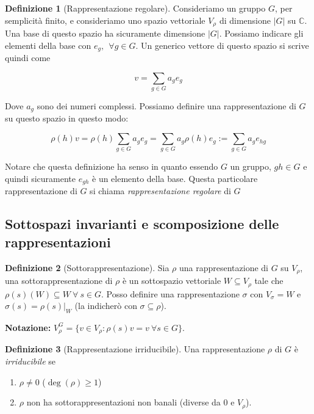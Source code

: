 \documentclass[11pt]{article}
\theoremstyle{plain}
\theoremstyle{definition}
\newtheorem{defn}{Definizione}[section]
\theoremstyle{remark}
\newcommand{\C}{\mathbb{C}}
\newcommand{\dsum}{\displaystyle\sum}
\begin{document}
\begin{defn}[Rappresentazione regolare]
  Consideriamo un gruppo $G$, per semplicità finito, e consideriamo uno spazio vettoriale $V_\rho$ di dimensione $|G|$ su $\C$. Una base di questo spazio ha sicuramente dimensione $|G|$. Possiamo indicare gli elementi della base con $e_g, \ \ \forall g \in G$. Un generico vettore di questo spazio si scrive quindi come

  \[ v = \dsum_{g \in G} a_g e_g \]

  Dove $a_g$ sono dei numeri complessi. Possiamo definire una rappresentazione di $G$ su questo spazio in questo modo:

  \[ \rho(h)v = \rho(h) \dsum_{g \in G} a_g e_g = \dsum_{g\in G} a_g \rho(h) e_g := \dsum_{g \in G} a_g e_{hg} \]

  Notare che questa definizione ha senso in quanto essendo $G$ un gruppo, $gh \in G$ e quindi sicuramente $e_{gh}$ è un elemento della base. Questa particolare rappresentazione di $G$ si chiama \emph{rappresentazione regolare} di $G$



  \label{defn:rappresentazione regolare}
\end{defn}



\subsection{Sottospazi invarianti e scomposizione delle rappresentazioni}



\begin{defn}[Sottorappresentazione]
Sia $\rho$ una rappresentazione di $G$ su $V_{\rho}$, una sottorappresentazione di $\rho$ è un sottospazio vettoriale $W\subseteq V_{\rho}$ tale che $\rho(s)(W)\subseteq W\ \forall\ s\in G$. Posso definire una rappresentazione $\sigma$ con $V_{\sigma}=W$ e $\sigma(s)=\rho(s)|_W$ (la indicherò con $\sigma\subseteq \rho$).
\end{defn}

\textbf{Notazione:} $V_{\rho}^G=\{v\in V_{\rho}: \rho(s)v=v\ \forall s\in G\}$.


\begin{defn}[Rappresentazione irriducibile]
Una rappresentazione $\rho$ di $G$ è \textit{irriducibile} se
\begin{enumerate}
	\item $\rho \neq 0$ ($\deg(\rho) \geq 1$)
	\item $\rho$ non ha sottorappresentazioni non banali (diverse da 0 e $V_{\rho}$).
\end{enumerate}

\end{defn}
\end{document}
